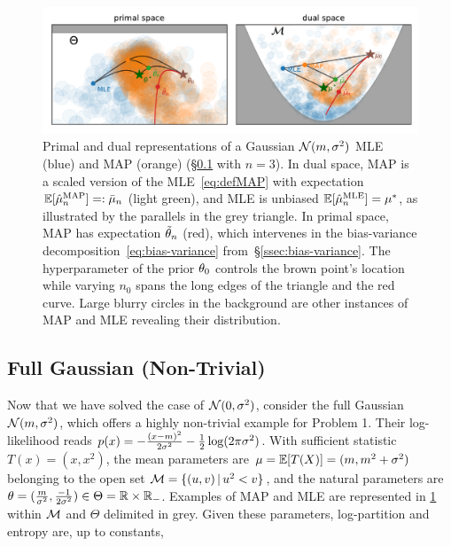 \begin{figure}[t]
	\centering
	\includegraphics[width=.8\textwidth]{figs/thales/numerical_schema_n=3.pdf}
	\caption{
	Primal and dual representations of a Gaussian ${\mathcal N}(m,\sigma^2)$ MLE (blue) and MAP (orange) (\S\ref{ssec:gaussian} with $n=3$).
	In dual space, MAP is a scaled version of the MLE~\eqref{eq:defMAP} with expectation $\operatorname{\mathbb{E}}[\hat{\mu}_n^\text{MAP}]=:\bar {\mu}_n$ (light green), and MLE is unbiased $\operatorname{\mathbb{E}}[\hat{\mu}_n^\text{MLE}]=\mu^*$, as illustrated by the parallels in the grey triangle.
	In primal space, MAP has expectation $\tilde {\theta}_n$ (red), which intervenes in the bias-variance decomposition~\eqref{eq:bias-variance} from~\S\ref{ssec:bias-variance}.
	The hyperparameter of the prior $\theta_0$ controls the brown point's location while varying $n_0$ spans the long edges of the triangle and the red curve.
	Large blurry circles in the background are other instances of MAP and MLE revealing their distribution. \vspace{-3ex}
	}
	\label{fig:thales}
\end{figure}

\subsection{Full Gaussian (Non-Trivial)}
\label{ssec:gaussian}
Now that we have solved the case of ${\mathcal N}(0,\sigma^2)$, consider the full Gaussian ${\mathcal N}(m,\sigma^2)$, which offers a highly non-trivial example for Problem 1.
Their log-likelihood reads $p(x) = -\frac{(x-m)^2}{2 \sigma^2} - \frac{1}{2} \log(2\pi\sigma^2)$.
With sufficient statistic $T(x)=(x, x^2)$,
the mean parameters are $\mu = \operatorname{\mathbb{E}}[T(X)] = (m , m^2 + \sigma^2)$ belonging to the open set ${\mathcal M}= \{(u,v) \,\vert\, u^2 < v\}$,
and the natural parameters are $\theta= (\frac{m}{\sigma^2} , \frac{-1}{2\sigma^2}) \in \Theta = \mathbb{R} \times \mathbb{R}_-$.
Examples of MAP and MLE  are represented in \cref{fig:thales} within ${\mathcal M}$ and $\Theta$ delimited in grey.
Given these parameters, log-partition and entropy are, up to constants,

